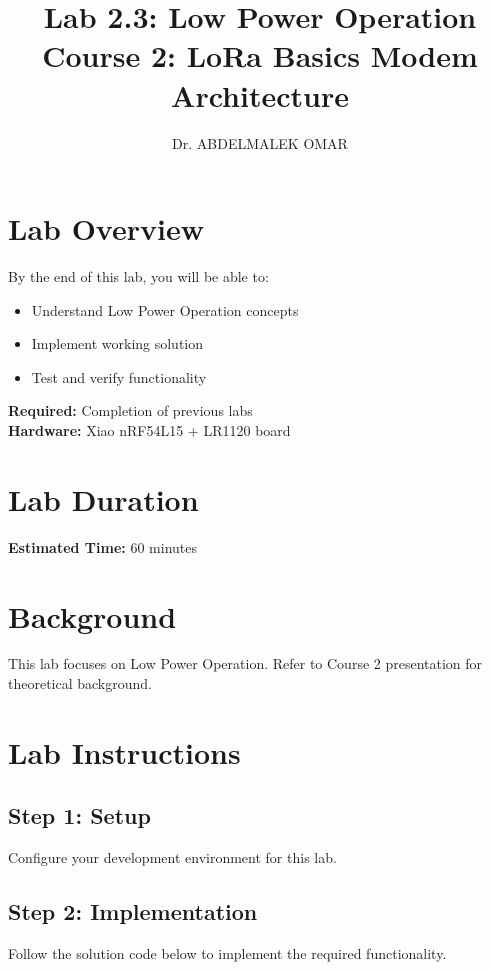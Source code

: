 \documentclass[11pt,a4paper]{article}
\title{\textbf{Lab 2.3: Low Power Operation}\\
\large Course 2: LoRa Basics Modem Architecture}
\author{Dr. ABDELMALEK OMAR}
\date{}
\begin{document}
\maketitle
\thispagestyle{fancy}

\section{Lab Overview}

\begin{objectivebox}
By the end of this lab, you will be able to:
\begin{itemize}
    \item Understand Low Power Operation concepts
    \item Implement working solution
    \item Test and verify functionality
\end{itemize}
\end{objectivebox}

\begin{prereqbox}
\textbf{Required:} Completion of previous labs\\
\textbf{Hardware:} Xiao nRF54L15 + LR1120 board
\end{prereqbox}

\section{Lab Duration}
\textbf{Estimated Time:} 60 minutes

\section{Background}

This lab focuses on Low Power Operation. Refer to Course 2 presentation for theoretical background.

\section{Lab Instructions}

\subsection{Step 1: Setup}
Configure your development environment for this lab.

\subsection{Step 2: Implementation}
Follow the solution code below to implement the required functionality.
\end{document}
